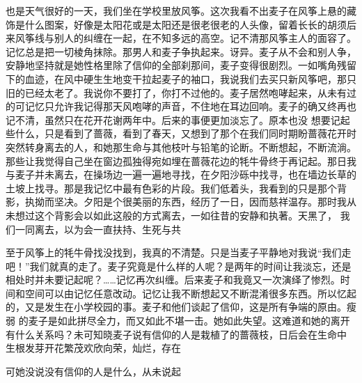 \documentclass{article}
\begin{document}
也是天气很好的一天，我们坐在学校里放风筝。这次我看不出麦子在风筝上悬的藏饰是什么图案，好像是太阳花或是太阳还是很老很老的人头像，留着长长的胡须后来风筝线与别人的纠缠在一起，在不知多远的高空。记不清那风筝主人的面容了。记忆总是把一切棱角抹除。那男人和麦子争执起来。讶异。麦子从不会和别人争，安静地坚持就是她性格里除了信仰的全部刹那间，麦子变得很剧烈。一如嘴角残留下的血迹，在风中硬生生地变干拉起麦子的袖口，我说我们去买只新风筝吧，那只旧的已经太老了。我说你不要打了，你打不过他的。麦子居然咆哮起来，从未有过的可记忆只允许我记得那天风咆哮的声音，不住地在耳边回响。麦子的确又终再也记不清，虽然只在花开花谢两年中。后来的事便更加淡忘了。原本也没
\newpage
想要记起些什么，只是看到了蔷薇，看到了春天，又想到了那个在我们同时期盼蔷薇花开时突然转身离去的人，和她那生命与其他枝叶与铅笔的论断。不断想起，不断流淌。那些让我觉得自己坐在窗边孤独得宛如埋在蔷薇花边的牦牛骨终于再记起。那日我与麦子并未离去，在操场边一遍一遍地寻找，在夕阳沙砾中找寻，也在墙边长草的土坡上找寻。那是我记忆中最有色彩的片段。我们低着头，我看到的只是那个背影，执拗而坚决。夕阳是个很美丽的东西，经历了一日，因而慈祥温存。那时我从未想过这个背影会以如此这般的方式离去，一如往昔的安静和执著。天黑了，
我们一同离去，以为会一直扶持、生死与共 

至于风筝上的牦牛骨找没找到，我真的不清楚。只是当麦子平静地对我说“我们走吧！”我们就真的走了。麦子究竟是什么样的人呢？是两年的时间让我淡忘，还是相处时并未要记起呢？……记忆再次纠缠。后来麦子和我竟又一次演绎了惨烈。时间和空间可以由记忆任意改动。记忆让我不断想起又不断混淆很多东西。所以忆起的，又是发生在小学校园的事。麦子和他们谈起了信仰，这是所有争端的原由。瘦弱
\newpage
的麦子是如此拼尽全力，而又如此不堪一击。她如此失望。这难道和她的离开有什么关系吗？未可知晓麦子说有信仰的人是栽植了的蔷薇枝，日后会在生命中
生根发芽开花繁茂欢欣向荣，灿烂，存在 


可她没说没有信仰的人是什么，从未说起 
\end{document}

